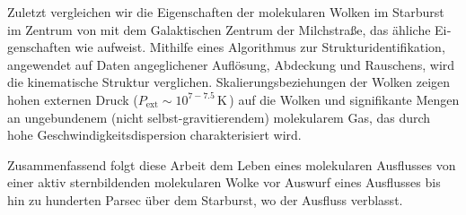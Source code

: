 \begin{otherlanguage}{ngerman}
Zuletzt vergleichen wir die Eigenschaften der molekularen Wolken im Starburst im Zentrum von  mit dem Galaktischen Zentrum der Milchstraße, das ähliche Eigenschaften wie  aufweist.
Mithilfe eines Algorithmus zur Strukturidentifikation, angewendet auf Daten angeglichener Auflösung, Abdeckung und Rauschens, wird die kinematische Struktur verglichen.
Skalierungsbeziehungen der Wolken zeigen hohen externen Druck ($P_\mathrm{ext} \sim 10^{7-7.5}$\,K\,) auf die Wolken und signifikante Mengen an ungebundenem (nicht selbst-gravitierendem) molekularem Gas, das durch hohe Geschwindigkeitsdispersion charakterisiert wird.

Zusammenfassend folgt diese Arbeit dem Leben eines molekularen Ausflusses von einer aktiv sternbildenden molekularen Wolke vor Auswurf eines Ausflusses bis hin zu hunderten Parsec über dem Starburst, wo der Ausfluss verblasst.



\end{otherlanguage}

\endgroup

\vfill
